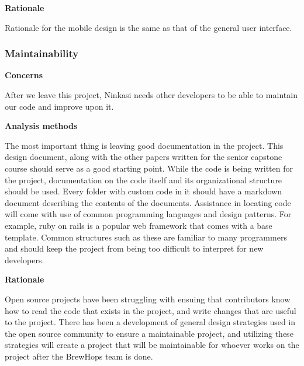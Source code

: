 \documentclass[draftclsnofoot,onecolumn,letterpaper,10pt]{IEEEtran}
\begin{document}
				\textbf{Rationale}

				Rationale for the mobile design is the same as that of the general user interface.

			\subsubsection{Maintainability}
				\textbf{Concerns}

				After we leave this project, Ninkasi needs other developers to be able to maintain our code and improve upon it.

				\textbf{Analysis methods}

				The most important thing is leaving good documentation in the project. This design document, along with the other papers written for the senior capstone course should serve as a good starting point. While the code is being written for the project, documentation on the code itself and its organizational structure should be used. Every folder with custom code in it should have a markdown document describing the contents of the documents. Assistance in locating code will come with use of common programming languages and design patterns. For example, ruby on rails is a popular web framework that comes with a base template. Common structures such as these are familiar to many programmers and should keep the project from being too difficult to interpret for new developers.

				\textbf{Rationale}

				Open source projects have been struggling with ensuing that contributors know how to read the code that exists in the project, and write changes that are useful to the project. There has been a development of general design strategies used in the open source community to ensure a maintainable project, and utilizing these strategies will create a project that will be maintainable for whoever works on the project after the BrewHops team is done.

				\clearpage
\end{document}
